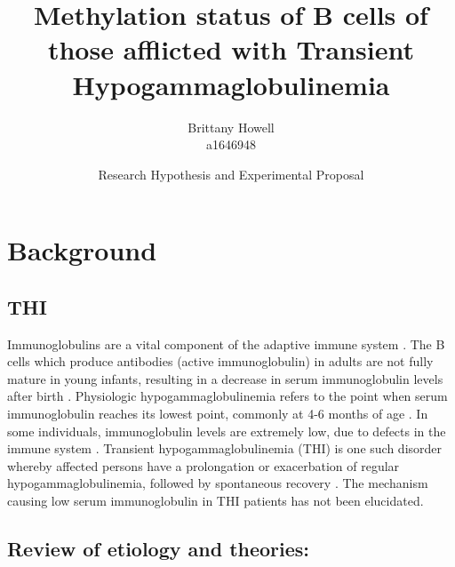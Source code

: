 \documentclass[12pt]{article}
\title{Methylation status of B cells of those afflicted with Transient Hypogammaglobulinemia}
\date{Research Hypothesis and Experimental Proposal}
\author{Brittany Howell \\ a1646948}
\begin{document}
	\maketitle
	
	\section{Background}
		
		\subsection{THI}
	
		Immunoglobulins are a vital component of the adaptive immune system \citep{Simon15}.  
		The B cells which produce antibodies (active immunoglobulin) in adults are not fully mature in young infants, resulting in a decrease in serum immunoglobulin levels after birth \citep{Martin10, Rechavi15}. 
		Physiologic hypogammaglobulinemia refers to the point when serum immunoglobulin reaches its lowest point, commonly at 4-6 months of age \citep{Dressler89}. 
		In some individuals, immunoglobulin levels are extremely low, due to defects in the immune system \citep{AlHerz14}. 
		Transient hypogammaglobulinemia (THI) is one such disorder whereby affected persons have a prolongation or exacerbation of regular hypogammaglobulinemia, followed by spontaneous recovery \citep{Gitlin56,Rosen66,Tiller78,Buckley83,McGeady87,Dressler89,Dalal98,AlHerz11,AlHerz14}.
		The mechanism causing low serum immunoglobulin in THI patients has not been elucidated.
		
	
%	
	
	
		\subsection{Review of etiology and theories: \citeauthor{Ovadia14} \citeyear{Ovadia14}}
			
\end{document}
